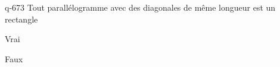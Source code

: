 \begin{truefalse}{q-673}
 Tout parallélogramme avec des diagonales de même longueur est un rectangle
\item* Vrai
\item Faux
\end{truefalse}

